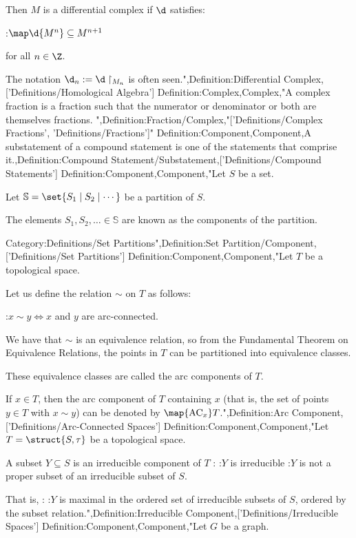Then $M$ is a differential complex if $\d$ satisfies:

:$\map \d {M^n} \subseteq M^{n + 1}$

for all $n \in \Z$.


The notation $\d_n := \d \restriction_{M_n}$ is often seen.",Definition:Differential Complex,['Definitions/Homological Algebra']
Definition:Complex,Complex,"A complex fraction is a fraction such that the numerator or denominator or both are themselves fractions.
",Definition:Fraction/Complex,"['Definitions/Complex Fractions', 'Definitions/Fractions']"
Definition:Component,Component,A substatement of a compound statement is one of the statements that comprise it.,Definition:Compound Statement/Substatement,['Definitions/Compound Statements']
Definition:Component,Component,"Let $S$ be a set.

Let $\mathbb S = \set {S_1 \mid S_2 \mid \cdots}$ be a partition of $S$.


The elements $S_1, S_2, \ldots \in \mathbb S$ are known as the components of the partition.


Category:Definitions/Set Partitions",Definition:Set Partition/Component,['Definitions/Set Partitions']
Definition:Component,Component,"Let $T$ be a topological space.

Let us define the relation $\sim$ on $T$ as follows:

:$x \sim y \iff x$ and $y$ are arc-connected.


We have that $\sim $ is an equivalence relation, so from the Fundamental Theorem on Equivalence Relations, the points in $T$ can be partitioned into equivalence classes.

These equivalence classes are called the arc components of $T$.


If $x \in T$, then the arc component of $T$ containing $x$ (that is, the set of points $y \in T$ with $x \sim y$) can be denoted by $\map {\operatorname {AC}_x} T$.",Definition:Arc Component,['Definitions/Arc-Connected Spaces']
Definition:Component,Component,"Let $T = \struct {S, \tau}$ be a topological space.


A subset $Y \subseteq S$ is an irreducible component of $T$ :
:$Y$ is irreducible
:$Y$ is not a proper subset of an irreducible subset of $S$.

That is, :
:$Y$ is maximal in the ordered set of irreducible subsets of $S$, ordered by the subset relation.",Definition:Irreducible Component,['Definitions/Irreducible Spaces']
Definition:Component,Component,"Let $G$ be a graph.

